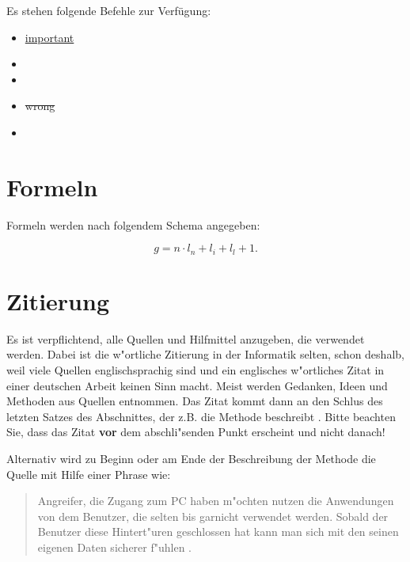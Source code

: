 Es stehen folgende Befehle zur Verfügung:\\

\begin{itemize}
\item \uline{important}  %
\item {}    %
\item {}       %
\item \sout{wrong}       %
\item {}     %
\end{itemize}


\section{Formeln}
\label{sec:Formeln}

Formeln werden nach folgendem Schema angegeben:

\begin{equation}
g = n\cdot l_n + l_i + l_l + 1.
\label{gle:Laenge}
\end{equation}




\section{Zitierung}\label{zitierung}

Es ist verpflichtend, alle Quellen und Hilfmittel anzugeben, die verwendet werden.
Dabei ist die w"ortliche Zitierung in der Informatik selten, schon deshalb, weil viele Quellen englischsprachig sind und ein englisches w"ortliches Zitat in einer deutschen Arbeit keinen Sinn macht.
Meist werden Gedanken, Ideen und Methoden aus Quellen entnommen.
Das Zitat kommt dann an den Schlus des letzten Satzes des Abschnittes, der z.B. die Methode beschreibt \cite{wissentschaftlichesArbeitMitLatex}.
Bitte beachten Sie, dass das Zitat \textbf{vor} dem abschli"senden Punkt erscheint und nicht danach!

Alternativ wird zu Beginn oder am Ende der Beschreibung der Methode die Quelle mit Hilfe einer Phrase wie:
\begin{quote}
Angreifer, die Zugang zum PC haben m"ochten nutzen die Anwendungen von dem Benutzer, die selten bis garnicht verwendet werden. Sobald der Benutzer diese Hintert"uren geschlossen hat kann man sich mit den seinen eigenen Daten sicherer f"uhlen \cite{ctWindowsEinfachAbsichern}.
\end{quote}


